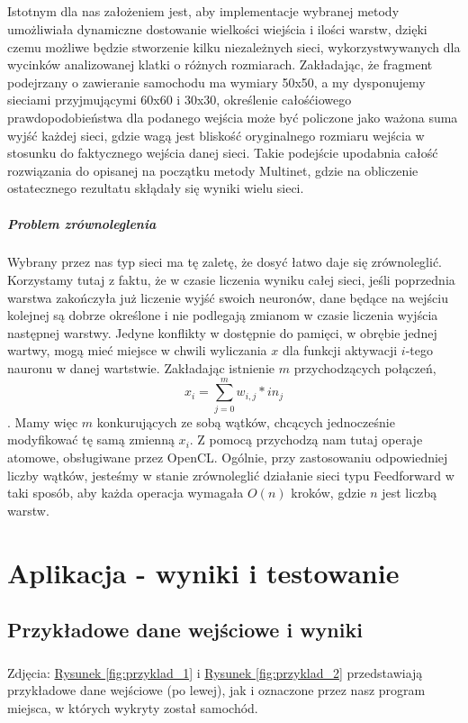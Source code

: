 \documentclass{article}
\begin{document}
\subparagraph{} Istotnym dla nas założeniem jest, aby implementacje wybranej metody umożliwiała dynamiczne dostowanie wielkości wiejścia i ilości warstw, dzięki czemu możliwe będzie stworzenie kilku niezależnych sieci, wykorzystwywanych dla wycinków analizowanej klatki o różnych rozmiarach. Zakładając, że fragment podejrzany o zawieranie samochodu ma wymiary 50x50, a my dysponujemy sieciami przyjmującymi 60x60 i 30x30, określenie całośćiowego prawdopodobieństwa dla podanego wejścia może być policzone jako ważona suma wyjść każdej sieci, gdzie wagą jest bliskość oryginalnego rozmiaru wejścia w stosunku do faktycznego wejścia danej sieci. Takie podejście upodabnia całość rozwiązania do opisanej na początku metody Multinet, gdzie na obliczenie ostatecznego rezultatu skłądały się wyniki wielu sieci.

\subparagraph{Problem zrównoleglenia} Wybrany przez nas typ sieci ma tę zaletę, że dosyć łatwo daje się zrównoleglić. Korzystamy tutaj z faktu, że w czasie liczenia wyniku całej sieci, jeśli poprzednia warstwa zakończyła już liczenie wyjść swoich neuronów, dane będące na wejściu kolejnej są dobrze określone i nie podlegają zmianom w czasie liczenia wyjścia następnej warstwy. Jedyne konflikty w dostępnie do pamięci, w obrębie jednej wartwy, mogą mieć miejsce w chwili wyliczania $x$ dla funkcji aktywacji $i$-tego nauronu w danej wartstwie. Zakładając istnienie $m$ przychodzących połączeń, \[x_i = \sum _{j=0}^{m}w_{i,j}*in_j\]. Mamy więc $m$ konkurujących ze sobą wątków, chcących jednocześnie modyfikować tę samą zmienną $x_i$. Z pomocą przychodzą nam tutaj operaje atomowe, obsługiwane przez OpenCL. Ogólnie, przy zastosowaniu odpowiedniej liczby wątków, jesteśmy w stanie zrównoleglić działanie sieci typu Feedforward w taki sposób, aby każda operacja wymagała $O(n)$ kroków, gdzie $n$ jest liczbą warstw.

\section{Aplikacja - wyniki i testowanie}
\subsection{Przykładowe dane wejściowe i wyniki}
\subparagraph{} Zdjęcia: \hyperref[fig:przyklad_1]{Rysunek \ref*{fig:przyklad_1}} i \hyperref[fig:przyklad_2]{Rysunek \ref*{fig:przyklad_2}}  przedstawiają przykładowe dane wejściowe (po lewej), jak i oznaczone przez nasz program miejsca, w których wykryty został samochód.
\end{document}
